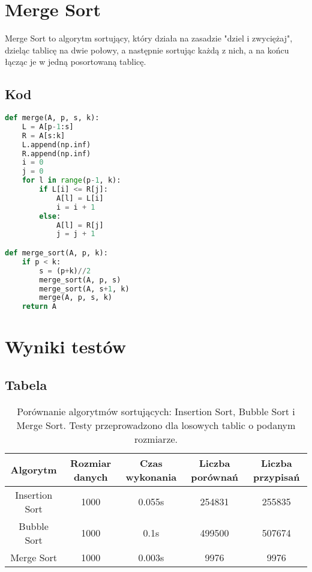 \documentclass{article}
\begin{document}
\section{Merge Sort}
Merge Sort to algorytm sortujący, który działa na zasadzie "dziel i zwyciężaj", dzieląc tablicę na dwie połowy, a następnie sortując każdą z nich, a na końcu łącząc je w jedną posortowaną tablicę.

\subsection{Kod}
\begin{lstlisting}[language=Python]
def merge(A, p, s, k):
    L = A[p-1:s]
    R = A[s:k]
    L.append(np.inf)
    R.append(np.inf)
    i = 0
    j = 0
    for l in range(p-1, k):
        if L[i] <= R[j]:
            A[l] = L[i]
            i = i + 1
        else:
            A[l] = R[j]
            j = j + 1

def merge_sort(A, p, k):
    if p < k:
        s = (p+k)//2
        merge_sort(A, p, s)
        merge_sort(A, s+1, k)
        merge(A, p, s, k)
    return A
\end{lstlisting}

\section{Wyniki testów}
\subsection{Tabela}
\begin{table}[H]
    \centering
    \begin{tabular}{|c|c|c|c|c|}
    \hline
    Algorytm & Rozmiar danych & Czas wykonania & Liczba porównań & Liczba przypisań \\
    \hline
    Insertion Sort & 1000 & 0.055s & 254831 & 255835 \\
    Bubble Sort & 1000 & 0.1s & 499500 & 507674 \\
    Merge Sort & 1000 & 0.003s & 9976 & 9976 \\
    \hline
    \end{tabular}
    \caption{Porównanie algorytmów sortujących: Insertion Sort, Bubble Sort i Merge Sort. Testy przeprowadzono dla losowych tablic o podanym rozmiarze.}
\end{table}
\end{document}
